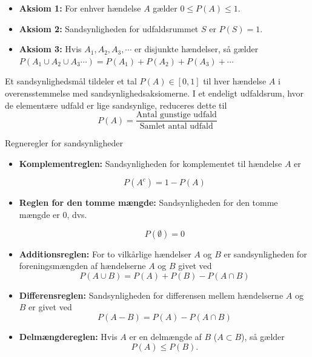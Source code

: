 \begin{axiom}
    \begin{itemize}
        \item \textbf{Aksiom 1:} For enhver hændelse \(A\) gælder \( 0 \leq P(A) \leq 1 \).
        \item \textbf{Aksiom 2:} Sandsynligheden for udfaldsrummet \(S\) er \(P(S) = 1\).
        \item \textbf{Aksiom 3:} Hvis \(A_1, A_2, A_3, \cdots\) er disjunkte hændelser, så gælder \(P\left(A_1 \cup A_2 \cup A_3 \cdots\right) = P\left(A_1\right) + P\left(A_2\right) + P\left(A_3\right) + \cdots\)
    \end{itemize}
\end{axiom}

\begin{definition}
    Et sandsynlighedsmål tildeler et tal \(P(A)\in[0,1]\) til hver hændelse \(A\) i overensstemmelse med sandsynlighedsaksiomerne. I et endeligt udfaldsrum, hvor de elementære udfald er lige sandsynlige, reduceres dette til
    \[
    P(A) = \frac{\text{Antal gunstige udfald}}{\text{Samlet antal udfald}}
    \]
\end{definition}

\begin{theorem}{Regneregler for sandsynligheder}
    \begin{itemize}
        \item \textbf{Komplementreglen:} Sandsynligheden for komplementet til hændelse $A$ er
    
        \[
        P(A^c) = 1 - P(A)
        \]

        \item \textbf{Reglen for den tomme mængde:} Sandsynligheden for den tomme mængde er 0, dvs.
        
        \[P(\emptyset) = 0\]
        
        \item \textbf{Additionsreglen:} For to vilkårlige hændelser $A$ og $B$ er sandsynligheden for foreningsmængden af hændelserne $A$ og $B$ givet ved
        \[
        P(A \cup B) = P(A) + P(B) - P(A \cap B)
        \]

        \item \textbf{Differensreglen:} Sandsynligheden for differensen mellem hændelserne $A$ og $B$ er givet ved
        \[
        P(A-B)=P(A)-P(A \cap B)
        \]
        \item \textbf{Delmængdereglen:} Hvis $A$ er en delmængde af $B$ ($A \subset B$), så gælder
        \[P(A) \leq P(B).\]
    \end{itemize}
\end{theorem}

